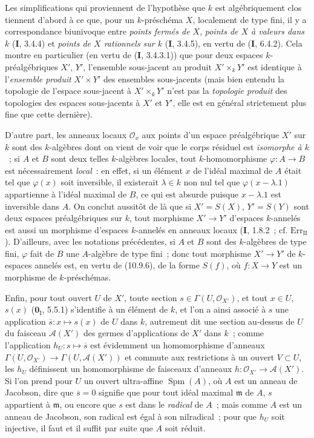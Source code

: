 \begin{env}[10.10.3]
\label{IV.10.10.3-fr}
Les simplifications qui proviennent de l'hypothèse que $k$ est algébriquement
clos tiennent d'abord à ce que, pour un $k$-préschéma $X$, localement de type
fini, il y a correspondance biunivoque entre \emph{points fermés de $X$},
\emph{points de $X$ à valeurs dans $k$} (\textbf I, 3.4.4) et \emph{points de
$X$ rationnels sur $k$} (\textbf I, 3.4.5), en vertu de (\textbf I, 6.4.2).
Cela montre en particulier (en vertu de (\textbf I, 3.4.3.1)) que pour deux
espaces $k$-préalgébriques $X'$, $Y'$, l'ensemble sous-jacent au produit
$X'\times_kY'$ est identique à l'\emph{ensemble produit} $X'\times Y'$ des
ensembles sous-jacents (mais bien entendu la topologie de l'espace sous-jacent
à $X'\times_kY'$ n'est pas la \emph{topologie produit} des topologies des
espaces sous-jacents à $X'$ et $Y'$, elle est en général strictement plus fine
que cette dernière).

D'autre part, les anneaux locaux $\mathcal O_x$ aux points d'un espace
préalgébrique $X'$ sur $k$ sont des $k$-algèbres dont on vient de voir que le
corps résiduel est \emph{isomorphe à $k$}~; si $A$ et $B$ sont deux telles
$k$-algèbres locales, tout $k$-homomorphisme $\varphi:A\to B$ est
nécessairement \emph{local}~: en effet, si un élément $x$ de l'idéal maximal de
$A$ était tel que $\varphi(x)$ soit inversible, il existerait $\lambda\in k$
non nul tel que $\varphi(x-\lambda.1)$ appartienne à l'idéal maximal de $B$, ce
qui est absurde puisque $x-\lambda.1$ est inversible dans $A$. On conclut
aussitôt de là que si $X'=S(X)$, $Y'=S(Y)$ sont deux espaces préalgébriques sur
$k$, tout morphisme $X'\to Y'$ d'espaces $k$-annelés est aussi un morphisme
d'espaces $k$-annelés en anneaux locaux (\textbf I, 1.8.2~; cf.
$\mathrm{Err}_{\mathrm{II}}$). D'ailleurs, avec les notations précédentes, si
$A$ et $B$ sont des $k$-algèbres de type fini, $\varphi$ fait de $B$ une
$A$-algèbre de type fini~; donc tout morphisme $X'\to Y'$ de $k$-espaces
annelés est, en vertu de (10.9.6), de la forme $S(f)$, où $f:X\to Y$ est un
morphisme de $k$-préschémas.

Enfin, pour tout ouvert $U$ de $X'$, toute section
$s\in\Gamma(U,\mathcal O_{X'})$, et tout $x\in U$, $s(x)$
($\mathbf 0_{\mathrm I}$, 5.5.1) s'identifie à un élément de $k$, et l'on a
ainsi associé à $s$ une application $\overline s:x\mapsto s(x)$ de $U$ dans
$k$, autrement dit une section au-dessus de $U$ du faisceau $\mathcal A(X')$
des germes d'applications de $X'$ dans $k$~; comme l'application
$h_U:s\mapsto\overline s$ est évidemment un homomorphisme d'anneaux
$\Gamma(U,\mathcal O_{X'})\to\Gamma(U,\mathcal A(X'))$ et commute aux
restrictions à un ouvert $V\subset U$, les $h_U$ définissent un homomorphisme
de faisceaux d'anneaux $h:\mathcal O_{X'}\to\mathcal A(X')$. Si l'on prend
pour $U$ un ouvert ultra-affine $\operatorname{Spm}(A)$, où $A$ est un anneau
de Jacobson, dire que $\overline s=0$ signifie que pour tout idéal maximal
$\mathfrak m$ de $A$, $s$ appartient à $\mathfrak m$, ou encore que $s$ est
dans le \emph{radical} de $A$~; mais comme $A$ est un anneau de Jacobson, son
radical est égal à son nilradical~; pour que $h_U$ soit injective, il faut et
il suffit par suite que $A$ soit réduit.
\end{env}

